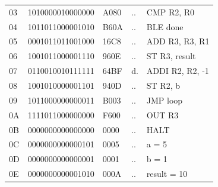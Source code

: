 \begin{tcolorbox}[stepbox, title={Instruction 18 \hfill ticks 52 to 54 \quad CMP R2, R0}]
{\begin{tabular}{@{}lllll@{}}
03 & 1010000010000000 & A080 & .. & CMP R2, R0\\
\rowcolor{pcc}04 & 1011011000001010 & B60A & .. & BLE done\\
05 & 0001011011001000 & 16C8 & .. & ADD R3, R3, R1\\
06 & 1001011000001110 & 960E & .. & ST R3, result\\
07 & 0110010010111111 & 64BF & d. & ADDI R2, R2, -1\\
08 & 1001010000001101 & 940D & .. & ST R2, b\\
09 & 1011000000000011 & B003 & .. & JMP loop\\
0A & 1111011000000000 & F600 & .. & OUT R3\\
0B & 0000000000000000 & 0000 & .. & HALT\\
\rowcolor{datac}0C & 0000000000000101 & 0005 & .. & a = 5\\
\rowcolor{datac}0D & 0000000000000001 & 0001 & .. & b = 1\\
\rowcolor{datac}0E & 0000000000001010 & 000A & .. & result = 10\\
\end{tabular}}
\end{tcolorbox}\par\vspace{3pt}
